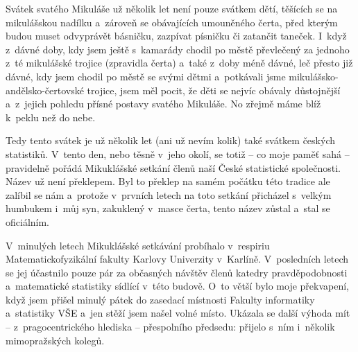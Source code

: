 
\gdef\mujnazevCS{Mikuklášské setkání členů České statistické společnosti}

\gdef\mujnazevEN{Meeting of the Czech Statistical Society on Saint Nicholas Day}

\gdef\mujnazevPR{\mujnazevCS}
\gdef\mujnazevDR{\mujnazevEN}

\gdef\mujauthor{Gejza Dohnal}
\author{\mujauthor}


\medskip

\noindent
Svátek svatého Mikuláše už několik let není pouze svátkem dětí, těšících se na mikulášskou nadílku a~zároveň se obávajících umouněného čerta, před kterým budou muset odvyprávět básničku, zazpívat písničku či zatančit taneček. I~když z~dávné doby, kdy jsem ještě s~kamarády chodil po městě převlečený za jednoho z~té mikulášské trojice (zpravidla čerta) a~také z~doby méně dávné, leč přesto již dávné, kdy jsem chodil po městě se svými dětmi a~potkávali jsme mikulášsko-andělsko-čertovské trojice, jsem měl pocit, že děti se nejvíc obávaly důstojnější a~z~jejich pohledu přísné postavy svatého Mikuláše. No zřejmě máme blíž k~peklu než do nebe. 

Tedy tento svátek je už několik let (ani už nevím kolik) také svátkem českých statistiků. V~tento den, nebo těsně v~jeho okolí, se totiž -- co moje paměť sahá -- pravidelně pořádá Mikuklášské setkání členů naší České statistické společnosti. Název  už není překlepem. Byl to překlep na samém počátku této tradice ale zalíbil se nám a~protože v~prvních letech na toto setkání přicházel s~velkým humbukem i~můj syn, zakuklený v~masce čerta, tento název zůstal a~stal se oficiálním. 

V~minulých letech Mikuklášské setkávání probíhalo v~respiriu Matema\-ticko\z fyzikální fakulty Karlovy Univerzity v~Karlíně. V~posledních letech se jej účastnilo pouze pár  za občasných návštěv členů katedry pravděpodobnosti a~matematické statistiky sídlící v~této budově. O~to větší bylo moje překvapení, když jsem přišel minulý pátek do zasedací místnosti Fakulty informatiky a~statistiky VŠE a~jen stěží jsem našel volné místo. Ukázala se další výhoda mít -- z~pragocentrického hlediska -- přespolního předsedu: přijelo s~ním i~několik mimopražských kolegů. 

